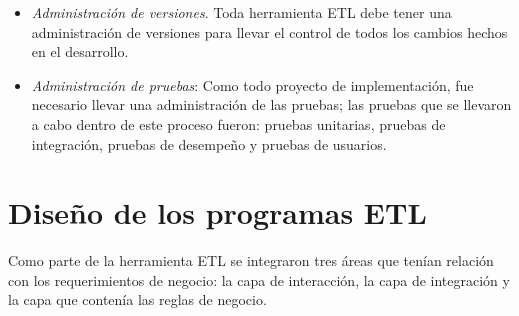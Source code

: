 \begin{itemize}
\item \textit{Administración de versiones}. Toda herramienta ETL debe tener una
  administración de versiones para llevar el control de todos los cambios hechos
  en el desarrollo.

\item \textit{Administración de pruebas}: Como todo proyecto de implementación,
  fue necesario llevar una administración de las pruebas; las pruebas que se
  llevaron a cabo dentro de este proceso fueron: pruebas unitarias, pruebas de
  integración, pruebas de desempeño y pruebas de usuarios.

\end{itemize}

\section{Diseño de los programas ETL}

Como parte de la herramienta ETL se integraron tres áreas que tenían relación
con los requerimientos de negocio: la capa de interacción, la capa de
integración y la capa que contenía las reglas de negocio.

